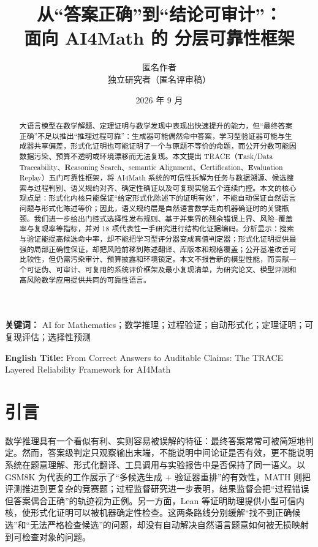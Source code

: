 \documentclass[UTF8,11pt,a4paper,fontset=fandol]{ctexart}
\title{\bfseries 从“答案正确”到“结论可审计”：\\面向 AI4Math 的 \trace{} 分层可靠性框架}
\author{匿名作者\\\small 独立研究者（匿名评审稿）}
\date{2026 年 9 月}
\newcommand{\trace}{\textsf{TRACE}}
\begin{document}
\maketitle

\begin{abstract}
大语言模型在数学解题、定理证明与数学发现中表现出快速提升的能力，但“最终答案正确”不足以推出“推理过程可靠”：生成器可能偶然命中答案，学习型验证器可能与生成器共享偏差，形式化证明也可能证明了一个与原题不等价的命题，而公开分数可能因数据污染、预算不透明或环境漂移而无法复现。本文提出 \trace{}（\textbf{T}ask/Data Traceability、\textbf{R}easoning Search、semantic \textbf{A}lignment、\textbf{C}ertification、\textbf{E}valuation Replay）五门可靠性框架，将 AI4Math 系统的可信性拆解为任务与数据溯源、候选搜索与过程判别、语义规约对齐、确定性确证以及可复现实验五个连续门控。本文的核心观点是：形式化内核只能保证“给定形式化陈述下的证明有效”，不能自动保证自然语言问题与形式化陈述等价；因此，语义规约层是自然语言数学走向机器确证时的关键瓶颈。我们进一步给出门控式选择性发布规则、基于并集界的残余错误上界、风险--覆盖率与复现率等指标，并对 18 项代表性一手研究进行结构化证据编码。分析显示：搜索与验证能提高候选命中率，却不能把学习型评分器变成真值判定器；形式化证明提供最强的局部正确性保证，却把风险前移到陈述翻译、库版本和规格覆盖；公开基准改善可比较性，但仍需污染审计、预算披露和环境锁定。本文不报告新的模型性能，而贡献一个可证伪、可审计、可复用的系统评价框架及最小复现清单，为研究论文、模型评测和高风险数学应用提供共同的可靠性语言。
\end{abstract}

\noindent\textbf{关键词：} AI for Mathematics；数学推理；过程验证；自动形式化；定理证明；可复现评估；选择性预测

\begin{center}
\small\textbf{English Title:} From Correct Answers to Auditable Claims: The TRACE Layered Reliability Framework for AI4Math
\end{center}

\section{引言}
数学推理具有一个看似有利、实则容易被误解的特征：最终答案常常可被简短地判定。然而，答案级判定只观察输出末端，不能说明中间论证是否有效，更不能说明系统在题意理解、形式化翻译、工具调用与实验报告中是否保持了同一语义。以 GSM8K 为代表的工作展示了“多候选生成 + 验证器重排”的有效性\cite{cobbe2021verifiers}，MATH 则把评测推进到更复杂的竞赛题\cite{hendrycks2021math}；过程监督研究进一步表明，结果监督会把“过程错误但答案偶合正确”的轨迹视为正例\cite{uesato2022feedback,lightman2024verify}。另一方面，Lean 等证明助理提供小型可信内核，使形式化证明可以被机器确定性检查\cite{demoura2021lean4,mathlib2020}。这两条路线分别缓解“找不到正确候选”和“无法严格检查候选”的问题，却没有自动解决自然语言题意如何被无损映射到可检查对象的问题。
\end{document}
